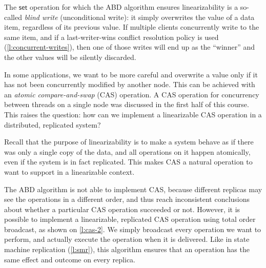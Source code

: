 
The $\mathsf{set}$ operation for which the ABD algorithm ensures linearizability is a so-called \emph{blind write} (unconditional write): it simply overwrites the value of a data item, regardless of its previous value.
If multiple clients concurrently write to the same item, and if a last-writer-wins conflict resolution policy is used (\autoref{l:concurrent-writes}), then one of those writes will end up as the ``winner'' and the other values will be silently discarded.

In some applications, we want to be more careful and overwrite a value only if it has not been concurrently modified by another node.
This can be achieved with an \emph{atomic compare-and-swap} (CAS) operation.
A CAS operation for concurrency between threads on a single node was discussed in the first half of this course.
This raises the question: how can we implement a linearizable CAS operation in a distributed, replicated system?

Recall that the purpose of linearizability is to make a system behave as if there was only a single copy of the data, and all operations on it happen atomically, even if the system is in fact replicated.
This makes CAS a natural operation to want to support in a linearizable context.

The ABD algorithm is not able to implement CAS, because different replicas may see the operations in a different order, and thus reach inconsistent conclusions about whether a particular CAS operation succeeded or not.
However, it is possible to implement a linearizable, replicated CAS operation using total order broadcast, as shown on \autoref{l:cas-2}.
We simply broadcast every operation we want to perform, and actually execute the operation when it is delivered.
Like in state machine replication (\autoref{l:smr}), this algorithm ensures that an operation has the same effect and outcome on every replica.

